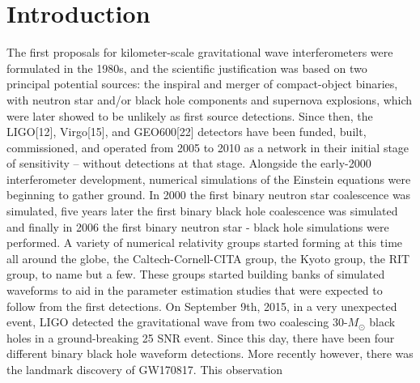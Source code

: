\chapter{Introduction}
\label{chap:intro}


\cite{}
The first proposals for kilometer-scale gravitational wave interferometers were
formulated in the 1980s, and the scientific justification was based on two principal
potential sources:  the inspiral and merger of compact-object binaries, with neutron star and/or
black hole components and supernova explosions, which were later showed to be unlikely as first source detections. Since
then, the LIGO[12], Virgo[15], and GEO600[22] detectors have been funded,
built, commissioned, and operated from 2005 to 2010 as a network in their initial
stage of sensitivity – without detections at that stage. Alongside the early-2000 interferometer development,
numerical simulations of the Einstein equations were beginning to gather ground. In 2000 the first
binary neutron star coalescence was simulated, five years later the first binary black hole coalescence
was simulated and finally in 2006 the first binary neutron star - black hole simulations were performed.
A variety of numerical relativity groups started forming at this time all around the globe, the Caltech-Cornell-CITA group,
the Kyoto group, the RIT group, to name but a few. These groups started building banks of simulated waveforms
to aid in the parameter estimation studies that were expected to follow from the first detections. On September 9th, 2015, in a very unexpected event, LIGO detected the gravitational wave from two coalescing 30-$M_\odot$ black holes
in a ground-breaking 25 SNR event. Since this day, there have been four different binary black hole waveform detections. More recently however, there was the landmark discovery of GW170817. This observation
